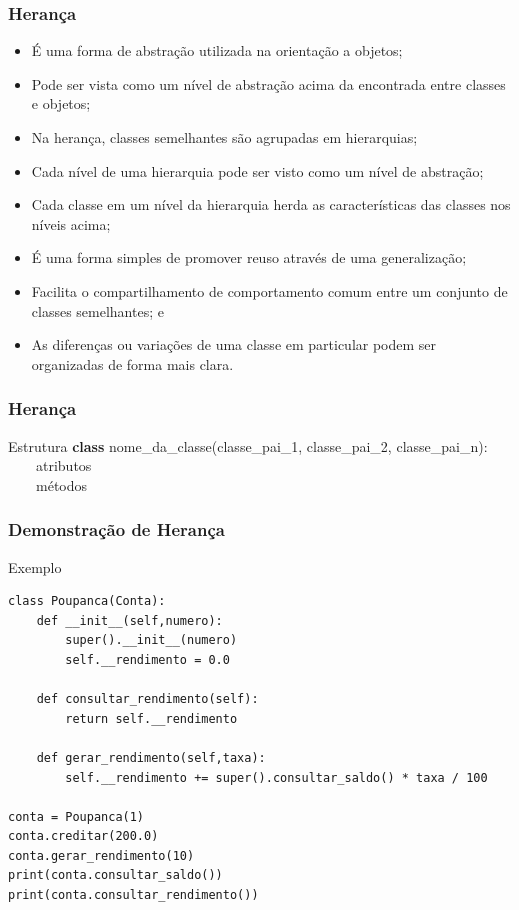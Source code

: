 \documentclass{beamer}
\begin{document}
\begin{frame}
	\frametitle{Herança}
	
	\begin{itemize}
	  \item É uma forma de abstração utilizada na orientação a objetos;
	  \item Pode ser vista como um nível de abstração acima da encontrada entre
	  classes e objetos;
	  \item Na herança, classes semelhantes são agrupadas em hierarquias;
	  \item Cada nível de uma hierarquia pode ser visto como um nível de abstração;
	  \item Cada classe em um nível da hierarquia herda as características das
	  classes nos níveis acima;
	  \item É uma forma simples de promover reuso através de uma generalização;
	  \item Facilita o compartilhamento de comportamento comum entre um conjunto de
	  classes semelhantes; e
	  \item As diferenças ou variações de uma classe em particular podem ser
	  organizadas de forma mais clara.
	\end{itemize}
\end{frame}

\begin{frame}
	\frametitle{Herança}
	
	\begin{block}{Estrutura}
	\textbf{class}
	nome\_da\_classe(classe\_pai\_1, classe\_pai\_2, classe\_pai\_n):\\
	~~~~atributos\\
	~~~~métodos
	\end{block}\vfill	
\end{frame}

\begin{frame}[fragile]
	\frametitle{Demonstração de Herança}
		
	\begin{exampleblock}{Exemplo}
		\begin{lstlisting}
class Poupanca(Conta):
    def __init__(self,numero):
        super().__init__(numero)
        self.__rendimento = 0.0
    
    def consultar_rendimento(self):
        return self.__rendimento

    def gerar_rendimento(self,taxa):
        self.__rendimento += super().consultar_saldo() * taxa / 100

conta = Poupanca(1)
conta.creditar(200.0)
conta.gerar_rendimento(10)
print(conta.consultar_saldo())
print(conta.consultar_rendimento())        
       \end{lstlisting}
	\end{exampleblock}
\end{frame}
\end{document}
